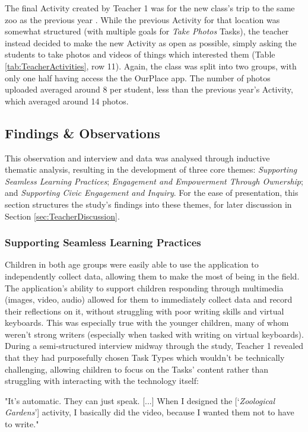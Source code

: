 The final Activity created by Teacher 1 was for the new class's trip to the same zoo as the previous year . While the previous Activity for that location was somewhat structured (with multiple goals for \textit{Take Photos} Tasks), the teacher instead decided to make the new Activity as open as possible, simply asking the students to take photos and videos of things which interested them (Table \ref{tab:TeacherActivities}, row 11). Again, the class was split into two groups, with only one half having access the the OurPlace app. The number of photos uploaded averaged around 8 per student, less than the previous year's Activity, which averaged around 14 photos.

\subsection{Findings \& Observations}

This observation and interview and data was analysed through inductive thematic analysis, resulting in the development of three core themes: \textit{Supporting Seamless Learning Practices}; \textit{Engagement and Empowerment Through Ownership}; and \textit{Supporting Civic Engagement and Inquiry}. For the ease of presentation, this section structures the study's findings into these themes, for later discussion in Section \ref{sec:TeacherDiscussion}.

\subsubsection{Supporting Seamless Learning Practices}

Children in both age groups were easily able to use the application to independently collect data, allowing them to make the most of being in the field. The application's ability to support children responding through multimedia (images, video, audio) allowed for them to immediately collect data and record their reflections on it, without struggling with poor writing skills and virtual keyboards. This was especially true with the younger children, many of whom weren't strong writers (especially when tasked with writing on virtual keyboards). During a semi-structured interview midway through the study, Teacher 1 revealed that they had purposefully chosen Task Types which wouldn't be technically challenging, allowing children to focus on the Tasks' content rather than struggling with interacting with the technology itself: 

\begin{displayquote}
"It’s automatic. They can just speak. [...] When I designed the [‘\textit{Zoological Gardens}’] activity, I basically did the video, because I wanted them not to have to write."
\end{displayquote}

